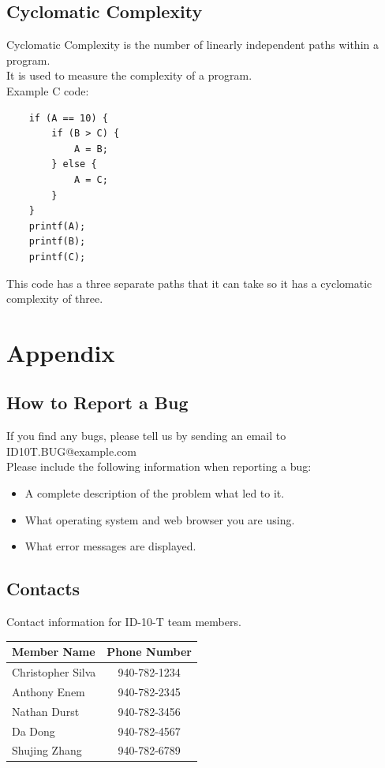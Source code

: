 \documentclass{scrreprt}
\begin{document}
	\section{Cyclomatic Complexity}
	Cyclomatic Complexity is the number of linearly independent paths within a program. \\
	It is used to measure the complexity of a program. \\
	
	Example C code:
	\begin{lstlisting}
	if (A == 10) {
	    if (B > C) {
	        A = B;
	    } else {
	        A = C;
	    }
	}
	printf(A);
	printf(B);
	printf(C);
	\end{lstlisting}
	This code has a three  separate paths that it can take so it has a cyclomatic complexity of three. 

	{\let\clearpage\relax \chapter{Appendix}}
	
	\section{How to Report a Bug}
	If you find any bugs, please tell us by sending an email to ID10T.BUG@example.com\\
	Please include the following information when reporting a bug:\\
	\begin{itemize}
		\item A complete description of the problem what led to it.
		\item What operating system and web browser you are using.
		\item What error messages are displayed.
	\end{itemize}
	
	\section{Contacts}
		Contact information for ID-10-T team members.\\
		\begin{tabular}{|l|c|}
			\hline
			Member Name       & Phone Number \\ \hline
			Christopher Silva & 940-782-1234 \\ \hline
			Anthony Enem      & 940-782-2345 \\ \hline
			Nathan Durst      & 940-782-3456 \\ \hline
			Da Dong           & 940-782-4567 \\ \hline
			Shujing Zhang     & 940-782-6789 \\ \hline
		\end{tabular}
\end{document}
